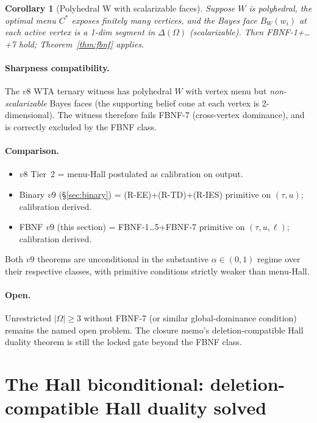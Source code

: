 \documentclass[11pt]{article}
\newtheorem{corollary}[theorem]{Corollary}
\theoremstyle{definition}
\theoremstyle{remark}
\begin{document}
\begin{corollary}[Polyhedral W with scalarizable faces]\label{cor:poly}
Suppose $W$ is polyhedral, the optimal menu $C^*$ exposes finitely many
vertices, and the Bayes face $B_W(w_i)$ at each active vertex is a
1-dim segment in $\Delta(\Omega)$ (scalarizable). Then FBNF-1+\dots+7
hold; Theorem~\ref{thm:fbnf} applies.
\end{corollary}

\paragraph{Sharpness compatibility.} The $v8$ WTA ternary witness has
polyhedral $W$ with vertex menu but \emph{non-scalarizable} Bayes faces
(the supporting belief cone at each vertex is 2-dimensional). The
witness therefore fails FBNF-7 (cross-vertex dominance), and is
correctly excluded by the FBNF class.

\paragraph{Comparison.}
\begin{itemize}
  \item $v8$ Tier~2 = menu-Hall postulated as calibration on output.
  \item Binary $v9$ (\S\ref{sec:binary}) = (R-EE)+(R-TD)+(R-IES)
    primitive on $(\tau, u)$; calibration derived.
  \item FBNF $v9$ (this section) = FBNF-1\dots5+FBNF-7 primitive on
    $(\tau, u, \ell)$; calibration derived.
\end{itemize}
Both $v9$ theorems are unconditional in the substantive $\alpha\in(0,1)$
regime over their respective classes, with primitive conditions
strictly weaker than menu-Hall.

\paragraph{Open.} Unrestricted $|\Omega|\ge 3$ without FBNF-7 (or
similar global-dominance condition) remains the named open problem.
The closure memo's deletion-compatible Hall duality theorem is still
the locked gate beyond the FBNF class.

\section{The Hall biconditional: deletion-compatible Hall duality solved}\label{sec:hall}
\end{document}
